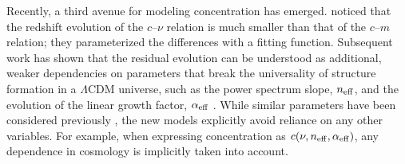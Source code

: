 \documentclass[5p,aas_macros]{elsarticle}
\begin{document}

Recently, a third avenue for modeling concentration has emerged. \citet{Prada2012} noticed that the redshift evolution of the $c$--$\nu$ relation is much smaller than that of the $c$--$m$ relation; they parameterized the differences with a fitting function. Subsequent work has shown that the residual evolution can be understood as additional, weaker dependencies on parameters that break the universality of structure formation in a $\Lambda$CDM universe, such as the power spectrum slope, $n_{\rm eff}$, and the evolution of the linear growth factor, $\alpha_{\rm eff}$ \citep{Diemer2015, Diemer2019, Ishiyama2020}. While similar parameters have been considered previously \citep[e.g.,][]{Bullock2001, Eke2001, Zhao2009}, the new models explicitly avoid reliance on any other variables. For example, when expressing concentration as $c(\nu, n_{\rm eff}, \alpha_{\rm eff})$, any dependence in cosmology is implicitly taken into account.


\end{document}
